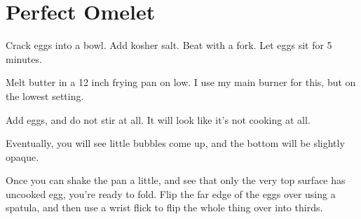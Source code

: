 
\section{Perfect Omelet}
\begin{recipe}



Crack eggs into a bowl. Add kosher salt. Beat with a fork. Let eggs sit for 5 minutes.



Melt butter in a 12 inch frying pan on low. I use my main burner for this, but on the lowest setting.

Add eggs, and do not stir at all. It will look like it's not cooking at all. 

Eventually, you will see little bubbles come up, and the bottom will be slightly opaque. 

Once you can shake the pan a little, and see that only the very top surface has uncooked egg, 
you're ready to fold. Flip the far edge of the eggs over using a spatula, and then use a wrist
flick to flip the whole thing over into thirds. 

\end{recipe}
